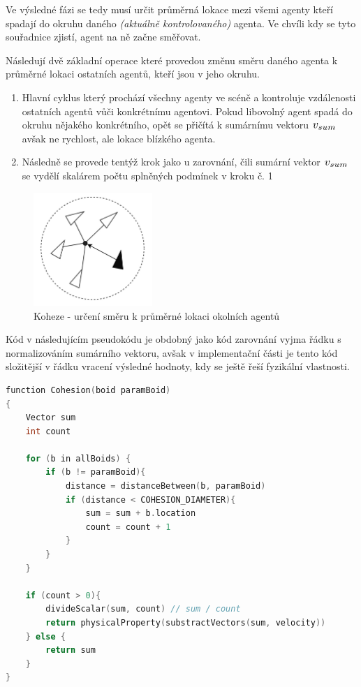 \documentclass[czech,public,dept460,male,cpdeclaration]{diploma}
\begin{document}
Ve výsledné fázi se tedy musí určit průměrná lokace mezi všemi agenty kteří spadají do okruhu daného \textit{(aktuálně kontrolovaného)} agenta. Ve chvíli kdy se tyto souřadnice zjistí, agent na ně začne směřovat.

Následují dvě základní operace které provedou změnu směru daného agenta k průměrné lokaci ostatních agentů, kteří jsou v jeho okruhu.

\begin{enumerate}
	\item Hlavní cyklus který prochází všechny agenty ve scéně a kontroluje vzdálenosti ostatních agentů vůči konkrétnímu agentovi. Pokud libovolný agent spadá do okruhu nějakého konkrétního, opět se přičítá k sumárnímu vektoru \( \scalebox{1.2}{$v_{sum}$} \) avšak ne rychlost, ale lokace blízkého agenta.
	\item Následně se provede tentýž krok jako u zarovnání, čili sumární vektor \( \scalebox{1.2}{$v_{sum}$} \) se vydělí skalárem počtu splněných podmínek v kroku č. 1
	
\end{enumerate}

\begin{figure}[H]\centering\includegraphics[width=0.4\textwidth]{Figures/cohesion2.jpg}
	\caption{Koheze - určení směru k průměrné lokaci okolních agentů}
\end{figure}

Kód v následujícím pseudokódu je obdobný jako kód zarovnání vyjma řádku s normalizováním sumárního vektoru, avšak v implementační části je tento kód složitější v řádku vracení výsledné hodnoty, kdy se ještě řeší fyzikální vlastnosti.

\begin{lstlisting}[language=c++,label=src:Cohesion pseudocode,caption=Pseudokód pro kohezi]
function Cohesion(boid paramBoid)
{	
	Vector sum
	int count
	
	for (b in allBoids) {
		if (b != paramBoid){
			distance = distanceBetween(b, paramBoid)
			if (distance < COHESION_DIAMETER){
				sum = sum + b.location
				count = count + 1
			}
		}
	}
	
	if (count > 0){
		divideScalar(sum, count) // sum / count
		return physicalProperty(substractVectors(sum, velocity))
	} else {
		return sum
	}
}
\end{lstlisting}
\end{document}
